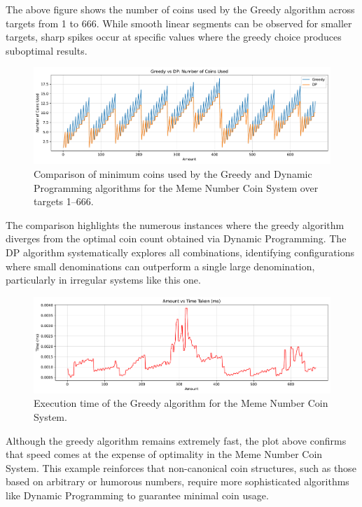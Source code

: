 \documentclass[12pt,a4paper]{report}
\begin{document}
\begin{itemize}
The above figure shows the number of coins used by the Greedy algorithm across targets from 1 to 666. While smooth linear segments can be observed for smaller targets, sharp spikes occur at specific values where the greedy choice produces suboptimal results.

\begin{figure}[H]
  \centering
  \includegraphics[width=\textwidth]{graphs/compare_coins_meme_plot.pdf}
  \caption{Comparison of minimum coins used by the Greedy and Dynamic Programming algorithms for the Meme Number Coin System over targets 1--666.}
  \label{fig:compare_coins_meme_number_plot}
\end{figure}

The comparison highlights the numerous instances where the greedy algorithm diverges from the optimal coin count obtained via Dynamic Programming. The DP algorithm systematically explores all combinations, identifying configurations where small denominations can outperform a single large denomination, particularly in irregular systems like this one.

\begin{figure}[H]
  \centering
  \includegraphics[width=\textwidth]{graphs/greedy_time_meme_plot.pdf}
  \caption{Execution time of the Greedy algorithm for the Meme Number Coin System.}
  \label{fig:greedy_time_meme_number_plot}
\end{figure}
\end{itemize}

Although the greedy algorithm remains extremely fast, the plot above confirms that speed comes at the expense of optimality in the Meme Number Coin System. This example reinforces that non-canonical coin structures, such as those based on arbitrary or humorous numbers, require more sophisticated algorithms like Dynamic Programming to guarantee minimal coin usage.
\end{document}
